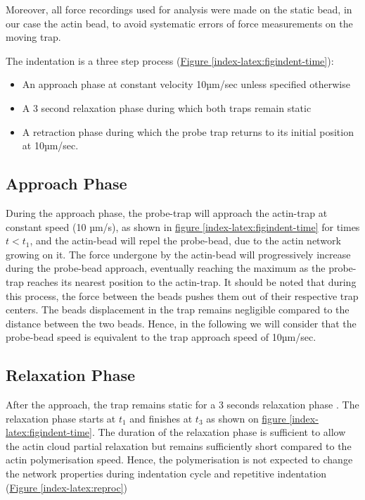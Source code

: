\documentclass[A4paperpaper,11pt,english]{sphinxmanual}
\begin{document}
Moreover, all force
recordings used for analysis were made on the static bead, in our case the actin bead, to avoid systematic errors of force measurements on the moving trap.

The indentation is a three step process (\hyperref[index-latex:figindent-time]{Figure  \ref*{index-latex:figindent-time}}):
\begin{itemize}
\item {} 
An approach phase at constant velocity 10µm/sec unless specified otherwise

\item {} 
A 3 second relaxation phase during which both traps remain static

\item {} 
A retraction phase  during which the probe trap returns to its initial position at 10µm/sec.

\end{itemize}


\subsection{Approach Phase}
\label{index-latex:approach-phase}
During the approach phase, the probe-trap will approach the actin-trap at constant speed (10 µm/s), as shown in
\hyperref[index-latex:figindent-time]{figure  \ref*{index-latex:figindent-time}} for times \(t < t_1\), and the actin-bead
will repel the probe-bead, due to the actin network growing on it. The force undergone
by the actin-bead will progressively increase during the probe-bead approach,
eventually reaching the maximum as the probe-trap reaches its nearest position
to the actin-trap. It should be noted that during this process,
the force between the beads pushes  them out of their respective trap centers.
The beads displacement in the trap remains negligible compared to the
distance between the two beads. Hence, in the following we will consider that the probe-bead speed is equivalent to the trap approach speed of 10µm/sec.


\subsection{Relaxation Phase}
\label{index-latex:relaxation-phase}
After the approach, the trap remains static for a 3 seconds relaxation phase
. The relaxation phase starts at \(t_1\) and
finishes at \(t_3\) as shown on \hyperref[index-latex:figindent-time]{figure  \ref*{index-latex:figindent-time}}. The duration of the relaxation phase is sufficient to allow the actin cloud  partial
relaxation but remains sufficiently short compared to
the actin polymerisation speed. Hence, the polymerisation is not expected to
change the network properties during indentation cycle and repetitive indentation (\hyperref[index-latex:reproc]{Figure  \ref*{index-latex:reproc}})
\end{document}
